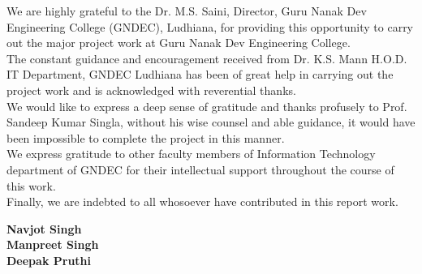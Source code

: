 \begin{Large}
\end{Large}
\vskip 0.1in %



\noindent We are highly grateful to the Dr. M.S. Saini, Director, Guru Nanak Dev Engineering College (GNDEC), Ludhiana, for providing this opportunity to carry out the major project work at Guru Nanak Dev Engineering College.\\

\noindent The constant guidance and encouragement received from Dr. K.S. Mann H.O.D. IT Department, GNDEC Ludhiana has been of great help in carrying out the project work and is acknowledged with reverential thanks.\\

\noindent We would like to express a deep sense of gratitude and thanks profusely to Prof. Sandeep Kumar Singla, without his wise counsel and able guidance, it would have been impossible to complete the project in this manner.\\

\noindent We express gratitude to other faculty members of Information Technology department of GNDEC for their intellectual support throughout the course of this work.\\

\noindent Finally, we are indebted to all whosoever have contributed in this report work.



\vskip 0.4in
\noindent \textbf {Navjot Singh}
\\ \noindent \textbf{Manpreet Singh}
\\ \noindent \textbf{Deepak Pruthi}

